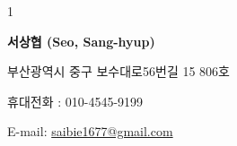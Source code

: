 \documentclass[11pt]{article} %
\def\WithKorean{1}
\begin{document}
\newcommand\profile{
	{\LARGE\bfseries 서상협 (Seo, Sang-hyup)} %
	\bigskip\bigskip\medskip %
	
	부산광역시 중구 보수대로56번길 15 806호 %
	\medskip %
	
	휴대전화 : 010-4545-9199 %
	\medskip %
	
	E-mail: \href{mailto:saibie1677@gmail.com}{saibie1677@gmail.com}\\ %
}

\newcommand\profileeng{
	{\LARGE\bfseries Seo, Sang-hyup (서상협)} %
	\bigskip\bigskip\medskip %
	
	48973, No.806, 15, Bosu-daero 56beon-gil, Jung-gu, Busan, Republic of Korea %
	\medskip %
	
	Mobile : 010-4545-9199 %
	\medskip %
	
	E-mail: \href{mailto:saibie1677@gmail.com}{saibie1677@gmail.com}\\ %
}





%

\if\WithKorean1
\profile

%
\end{document}
